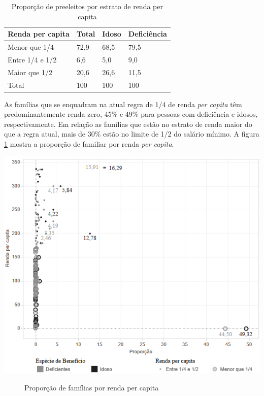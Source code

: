 \documentclass[
	12pt,				%
	openright,			%
	twoside,			%
	a4paper,			%
	english,			%
	french,				%
	spanish,			%
	brazil				%
	]{abntex2}
\begin{document}
\begin{table}[H]
	\footnotesize
	\centering
	\caption{Proporção de preeleitos por estrato de renda per capita}
	\label{tab_eleitos_renda}
	\begin{tabular}{@{}p{11cm}lll@{}}
		\toprule
		\textbf{Renda per capita} & \textbf{Total} & \textbf{Idoso} & \textbf{Deficiência} \\ \midrule
		Menor que 1/4    & 72,9  & 68,5  & 79,5        \\
		Entre 1/4 e 1/2  & 6,6   & 5,0   & 9,0         \\
		Maior que 1/2    & 20,6  & 26,6  & 11,5        \\ \midrule
		Total            & 100   & 100   & 100         \\ \bottomrule
	\end{tabular}
\end{table}

As famílias que se enquadram na atual regra de 1/4 de renda \textit{per capita} têm predominantemente renda zero, 45\% e 49\%  para pessoas com deficiência e idosos, respectivamente. Em relação as famílias que estão no estrato de renda maior do que a regra atual, mais de 30\% estão no limite de 1/2 do salário mínimo. A figura \ref{rend_resumo_figura} mostra a proporção de familiar por renda \textit{per capita}.

\begin{center}
	\includegraphics[]{distrbuicao_percapita.png}
	\begin{figure}[!h]
		\caption{Proporção de famílias por renda per capita }
		\label{rend_resumo_figura}
	\end{figure}
\end{center}
\end{document}
